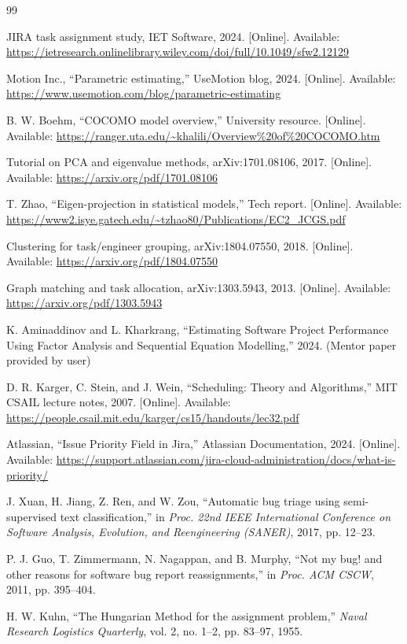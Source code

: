 \documentclass[journal]{IEEEtran}
\begin{document}
\begin{thebibliography}{99}

JIRA task assignment study, IET Software, 2024. [Online]. Available: \url{https://ietresearch.onlinelibrary.wiley.com/doi/full/10.1049/sfw2.12129}

Motion Inc., ``Parametric estimating,'' UseMotion blog, 2024. [Online]. Available: \url{https://www.usemotion.com/blog/parametric-estimating}

B. W. Boehm, ``COCOMO model overview,'' University resource. [Online]. Available: \url{https://ranger.uta.edu/~khalili/Overview%20of%20COCOMO.htm}

Tutorial on PCA and eigenvalue methods, arXiv:1701.08106, 2017. [Online]. Available: \url{https://arxiv.org/pdf/1701.08106}

T. Zhao, ``Eigen-projection in statistical models,'' Tech report. [Online]. Available: \url{https://www2.isye.gatech.edu/~tzhao80/Publications/EC2_JCGS.pdf}

Clustering for task/engineer grouping, arXiv:1804.07550, 2018. [Online]. Available: \url{https://arxiv.org/pdf/1804.07550}

Graph matching and task allocation, arXiv:1303.5943, 2013. [Online]. Available: \url{https://arxiv.org/pdf/1303.5943}

K. Aminaddinov and L. Kharkrang, ``Estimating Software Project Performance Using Factor Analysis and Sequential Equation Modelling,'' 2024. (Mentor paper provided by user)

D. R. Karger, C. Stein, and J. Wein, ``Scheduling: Theory and Algorithms,'' MIT CSAIL lecture notes, 2007. [Online]. Available: \url{https://people.csail.mit.edu/karger/cs15/handouts/lec32.pdf}

Atlassian, ``Issue Priority Field in Jira,'' Atlassian Documentation, 2024. [Online]. Available: \url{https://support.atlassian.com/jira-cloud-administration/docs/what-is-priority/}

J. Xuan, H. Jiang, Z. Ren, and W. Zou, ``Automatic bug triage using semi-supervised text classification,'' in \emph{Proc. 22nd IEEE International Conference on Software Analysis, Evolution, and Reengineering (SANER)}, 2017, pp. 12–23.

P. J. Guo, T. Zimmermann, N. Nagappan, and B. Murphy, ``Not my bug! and other reasons for software bug report reassignments,'' in \emph{Proc. ACM CSCW}, 2011, pp. 395–404.

H. W. Kuhn, ``The Hungarian Method for the assignment problem,'' \emph{Naval Research Logistics Quarterly}, vol. 2, no. 1–2, pp. 83–97, 1955.

\end{thebibliography}
\end{document}
